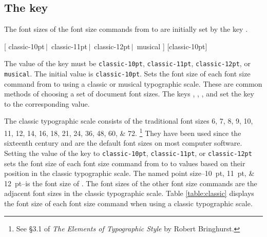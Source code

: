\documentclass{beery}
\begin{document}
\subsection
  {%
    The key
    \texorpdfstring
      {}
      {typographic-scale}%
  }
\label{subsec:typographicscale}

The font sizes of the font size commands from  to  are initially set by the key .

\begin{mydisplaycode}
    [
      classic-10pt$\,\vert\,$\allowbreak
      classic-11pt$\,\vert\,$\allowbreak
      classic-12pt$\,\vert\,$\allowbreak\hspace*{1.5em}%
      musical
    ]
    [classic-10pt]
  \newline
  \newline
  \newline
  \nopagebreak\newline
\end{mydisplaycode}

The value of the key  must be \texttt{classic-10pt}, \texttt{classic-11pt}, \texttt{classic-12pt}, or \texttt{musical}.
The initial value is \texttt{classic-10pt}.
Sets the font size of each font size command from  to  using a classic or musical typographic scale.
These are common methods of choosing a set of document font sizes.
The keys , , , and  set the key  to the corresponding value.

The classic typographic scale consists of the traditional font sizes
\numlist{6;7;8;9;10;11;12;14;16;18;21;24;36;48;60;72}.%
\footnote{See \S3.1 of \textit{The Elements of Typographic Style} by Robert Bringhurst.}
They have been used since the sixteenth century and are the default font sizes on most computer software.
Setting the value of the key  to \texttt{classic-10pt}, \texttt{classic-11pt}, or \texttt{classic-12pt} sets the font size of each font size command from  to  to values based on their position in the classic typographic scale.
The named point size\---\qtylist[list-final-separator={, or }]{10;11;12}{pt}\---is the font size of .
The font sizes of the other font size commands are the adjacent font sizes in the classic typographic scale.
Table \ref{table:classic} displays the font size of each font size command when using a classic typographic scale.
\end{document}
